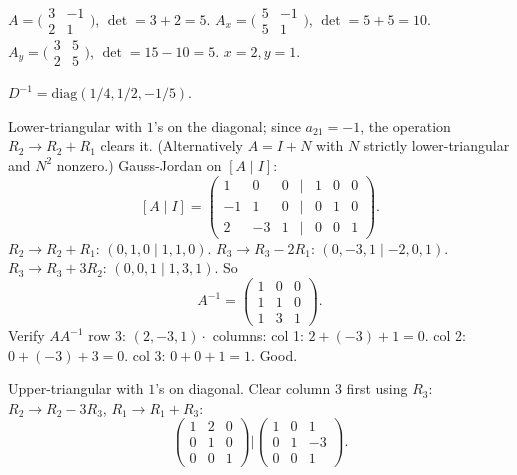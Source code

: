 \begin{solutions}
    \item $A = \bigl(\begin{smallmatrix} 3 & -1 \\ 2 & 1 \end{smallmatrix}\bigr)$, $\det = 3 + 2 = 5$. $A_{x} = \bigl(\begin{smallmatrix} 5 & -1 \\ 5 & 1 \end{smallmatrix}\bigr)$, $\det = 5 + 5 = 10$. $A_{y} = \bigl(\begin{smallmatrix} 3 & 5 \\ 2 & 5 \end{smallmatrix}\bigr)$, $\det = 15 - 10 = 5$. $x = 2, y = 1$.
    \item $D^{-1} = \mathrm{diag}(1/4, 1/2, -1/5)$.
    \item Lower-triangular with $1$'s on the diagonal; since $a_{21} = -1$, the operation $R_{2} \to R_{2} + R_{1}$ clears it. (Alternatively $A = I + N$ with $N$ strictly lower-triangular and $N^{2}$ nonzero.) Gauss-Jordan on $[A \mid I]$:
    \[
    [A \mid I] = \begin{pmatrix} 1 & 0 & 0 & | & 1 & 0 & 0 \\ -1 & 1 & 0 & | & 0 & 1 & 0 \\ 2 & -3 & 1 & | & 0 & 0 & 1 \end{pmatrix}.
    \]
    $R_{2} \to R_{2} + R_{1}$: $(0, 1, 0 \mid 1, 1, 0)$. $R_{3} \to R_{3} - 2 R_{1}$: $(0, -3, 1 \mid -2, 0, 1)$. $R_{3} \to R_{3} + 3 R_{2}$: $(0, 0, 1 \mid 1, 3, 1)$. So
    \[
    A^{-1} = \begin{pmatrix} 1 & 0 & 0 \\ 1 & 1 & 0 \\ 1 & 3 & 1 \end{pmatrix}.
    \]
    Verify $A A^{-1}$ row 3: $(2, -3, 1) \cdot $ columns: col 1: $2 + (-3) + 1 = 0$. col 2: $0 + (-3) + 3 = 0$. col 3: $0 + 0 + 1 = 1$. Good.
    \item Upper-triangular with $1$'s on diagonal. Clear column 3 first using $R_{3}$: $R_{2} \to R_{2} - 3 R_{3}$, $R_{1} \to R_{1} + R_{3}$:
    \[
    \begin{pmatrix} 1 & 2 & 0 \\ 0 & 1 & 0 \\ 0 & 0 & 1 \end{pmatrix} \Big| \begin{pmatrix} 1 & 0 & 1 \\ 0 & 1 & -3 \\ 0 & 0 & 1 \end{pmatrix}.
\]
\end{solutions}
